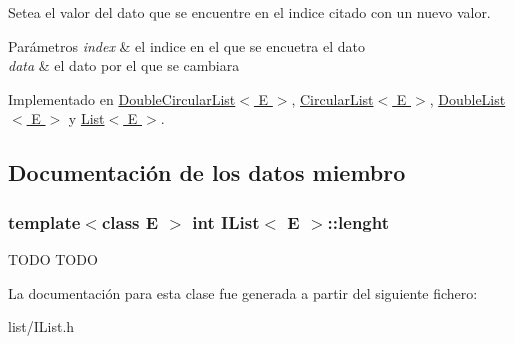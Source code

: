 Setea el valor del dato que se encuentre en el indice citado con un nuevo valor. 


\begin{DoxyParams}{Parámetros}
{\em index} & el indice en el que se encuetra el dato \\
\hline
{\em data} & el dato por el que se cambiara \\
\hline
\end{DoxyParams}


Implementado en \hyperlink{classDoubleCircularList_a95e0f27bda1158233015ee3ff27b3ade}{Double\-Circular\-List$<$ E $>$}, \hyperlink{classCircularList_aa54489e11ad76bf929f92b1dce97a3a3}{Circular\-List$<$ E $>$}, \hyperlink{classDoubleList_a3c95ac3c3190b347c4a343776264bf67}{Double\-List$<$ E $>$} y \hyperlink{classList_ac8b31be96806bd56f655436629ac2e7a}{List$<$ E $>$}.



\subsection{Documentación de los datos miembro}
\hypertarget{classIList_a64ce981ba1104bbb482068983cb5a3bc}{
\subsubsection[{lenght}]{\setlength{\rightskip}{0pt plus 5cm}template$<$class E $>$ int {\bf I\-List}$<$ E $>$\-::lenght\hspace{0.3cm}{\ttfamily [protected]}}}\label{classIList_a64ce981ba1104bbb482068983cb5a3bc}
T\-O\-D\-O T\-O\-D\-O 

La documentación para esta clase fue generada a partir del siguiente fichero\-:\begin{DoxyCompactItemize}
\item 
list/I\-List.\-h\end{DoxyCompactItemize}
